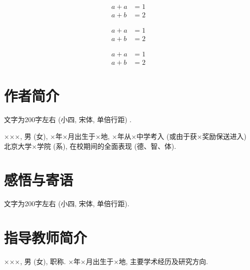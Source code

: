 \documentclass{urtemp}
\begin{document}
$$
\begin{aligned}
    a+a&=1\\
    a+b&=2
\end{aligned}
$$

\begin{equation}
\begin{aligned}
    a+a&=1\\
    a+b&=2
\end{aligned}\label{eqA1}
\end{equation}

\begin{subequations}
    \begin{align}
        a+a&=1\label{eqA2}\\
        a+b&=2\label{eqA3}
    \end{align}
\end{subequations}
    

\section*{作者简介}

文字为200字左右 (小四, 宋体, 单倍行距) .

×××, 男 (女), ×年×月出生于×地, ×年从×中学考入 (或由于获×奖励保送进入) 北京大学×学院 (系), 在校期间的全面表现 (德、智、体).

\section*{感悟与寄语}

文字为200字左右 (小四, 宋体, 单倍行距).

\section*{指导教师简介}

×××, 男 (女), 职称. ×年×月出生于×地, 主要学术经历及研究方向.
\end{document}
